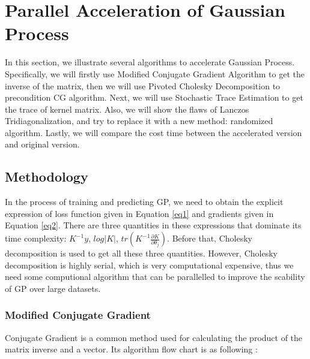 \documentclass{article}
\begin{document}
\section{Parallel Acceleration of Gaussian Process}
In this section, we illustrate several algorithms to accelerate Gaussian Process. Specifically, we will firstly use Modified Conjugate Gradient Algorithm to get the inverse of the matrix, then we will use Pivoted Cholesky Decomposition to precondition CG algorithm. Next, we will use Stochastic Trace Estimation to get the trace of kernel matrix. Also, we will show the flaws of Lanczos Tridiagonalization, and try to replace it with a new method: randomized algorithm. Lastly, we will compare the cost time between the accelerated version and original version. 
\subsection{Methodology}
In the process of training and predicting GP, we need to obtain the explicit expression of loss function given in Equation \ref{eq1} and gradients given in Equation \ref{eq2}. There are three quantities in these expressions that dominate its time complexity: $K^{-1}y$, $log|K|$, $tr(K^{-1}\frac{\partial K}{\partial \theta_j})$. Before that, Cholesky decomposition is used to get all these three quantities. However, Cholesky decomposition is highly serial, which is very computational expensive, thus we need some computional algorithm that can be parallelled to improve the scability of GP over large datasets.\\
\subsubsection{Modified Conjugate Gradient}
Conjugate Gradient is a common method used for calculating the product of the matrix inverse and a vector. Its algorithm flow chart is as following \cite{10}:
\end{document}
